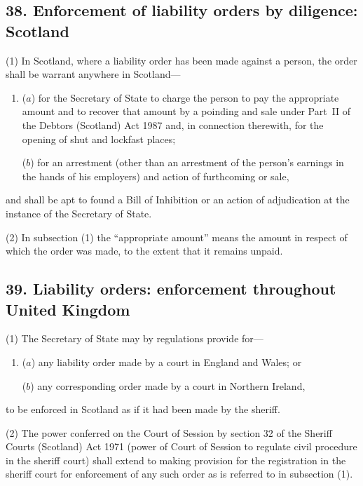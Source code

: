 \documentclass[12pt,a4paper]{article}
\begin{document}

\subsection{38. Enforcement of liability orders by diligence: Scotland}

(1) In Scotland, where a liability order has been made against a person, the order shall be warrant anywhere in Scotland—
\begin{enumerate}\item[]
($a$) for the Secretary of State to charge the person to pay the appropriate amount and to recover that amount by a poinding and sale under Part~II of the Debtors (Scotland) Act 1987 and, in connection therewith, for the opening of shut and lockfast places;

($b$) for an arrestment (other than an arrestment of the person’s earnings in the hands of his employers) and action of furthcoming or sale,
\end{enumerate}
and shall be apt to found a Bill of Inhibition or an action of adjudication at the instance of the Secretary of State.

(2) In subsection (1)  the “appropriate amount” means the amount in respect of which the order was made, to the extent that it remains unpaid.


\subsection{39. Liability orders: enforcement throughout United Kingdom}

(1) The Secretary of State may by regulations provide for—
\begin{enumerate}\item[]
($a$) any liability order made by a court in England and Wales; or

($b$) any corresponding order made by a court in Northern Ireland,
\end{enumerate}
to be enforced in Scotland as if it had been made by the sheriff.

(2) The power conferred on the Court of Session by section 32 of the Sheriff Courts (Scotland) Act 1971 (power of Court of Session to regulate civil procedure in the sheriff court) shall extend to making provision for the registration in the sheriff court for enforcement of any such order as is referred to in subsection (1).
\end{document}
